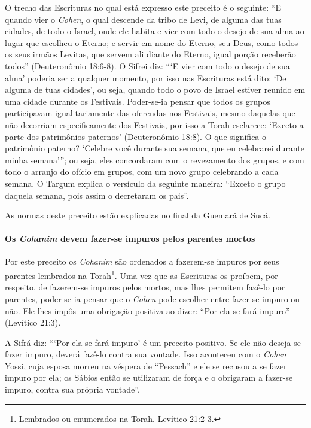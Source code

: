 O trecho das Escrituras no qual está expresso este preceito é o
seguinte: ``E quando vier o \textit{Cohen}, o qual descende da tribo de Levi,
de alguma das tuas cidades, de todo o Israel, onde ele habita e vier com
todo o desejo de sua alma ao lugar que escolheu o Eterno; e servir em
nome do Eterno, seu Deus, como todos os seus irmãos Levitas, que servem
ali diante do Eterno, igual porção receberão todos'' (Deuteronômio
18:6-8). O Sifrei diz: ```E vier com todo o desejo de sua alma' poderia ser a qualquer momento, por isso nas
Escrituras está dito: `De alguma de tuas cidades', ou seja, quando todo
o povo de Israel estiver reunido em uma cidade durante os Festivais.
Poder-se-ia pensar que todos os grupos participavam igualitariamente das
oferendas nos Festivais, mesmo daquelas que não decorriam
especificamente dos Festivais, por isso a Torah esclarece: `Exceto a
parte dos patrimônios paternos' (Deuteronômio 18:8). O que significa o
patrimônio paterno? `Celebre você durante sua semana, que eu celebrarei
durante minha semana'''; ou seja, eles concordaram com o revezamento
dos grupos, e com todo o arranjo do ofício em grupos, com um novo grupo
celebrando a cada semana. O Targum explica o versículo da seguinte
maneira: ``Exceto o grupo daquela semana, pois assim o decretaram os
pais''.

As normas deste preceito estão explicadas no final da Guemará de Sucá.

\paragraph{Os \textit{Cohanim} devem fazer-se impuros pelos parentes mortos}

Por este preceito os \textit{Cohanim} são ordenados a fazerem-se impuros por
seus parentes lembrados na Torah\footnote{Lembrados ou enumerados na Torah. Levítico 21:2-3.}. Uma vez que as
Escrituras os proíbem, por respeito, de fazerem-se impuros pelos
mortos, mas lhes permitem fazê-lo por parentes, poder-se-ia pensar que o
\textit{Cohen} pode escolher entre fazer-se impuro ou não. Ele lhes impôs uma
obrigação positiva ao dizer: ``Por ela se fará impuro'' (Levítico 21:3).

A Sifrá diz: ```Por ela se fará impuro' é um preceito positivo. Se ele
não deseja se fazer impuro, deverá fazê-lo contra sua vontade. Isso
aconteceu com o \textit{Cohen} Yossi, cuja esposa morreu na véspera de
``Pessach'' e ele se recusou a se fazer impuro por ela; os Sábios então
se utilizaram de força e o obrigaram a fazer-se impuro, contra sua
própria vontade''.

